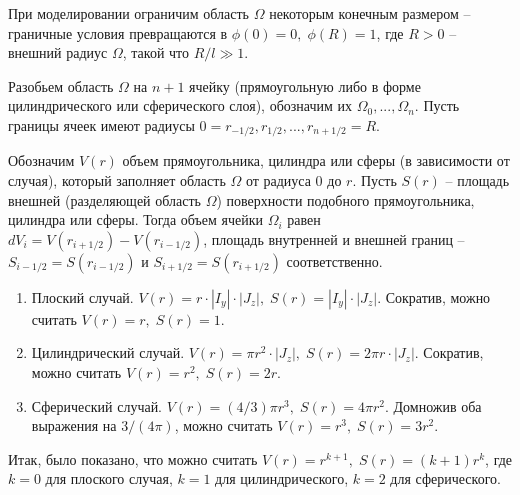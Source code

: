 При моделировании ограничим область $\Omega$ некоторым конечным размером -- граничные условия превращаются в $\phi(0) = 0, \; \phi(R) = 1$, где $R > 0$ -- внешний радиус $\Omega$, такой что $R / l \gg 1$.

Разобьем область $\Omega$ на $n + 1$ ячейку (прямоугольную либо в форме цилиндрического или сферического слоя), обозначим их $\Omega_0, ..., \Omega_n$. Пусть границы ячеек имеют радиусы $0 = r_{-1/2}, r_{1/2}, ..., r_{n + 1/2} = R$.

Обозначим $V(r)$ объем прямоугольника, цилиндра или сферы (в зависимости от случая), который заполняет область $\Omega$ от радиуса $0$ до $r$. Пусть $S(r)$ -- площадь внешней (разделяющей область $\Omega$) поверхности подобного прямоугольника, цилиндра или сферы. Тогда объем ячейки $\Omega_i$ равен $dV_i = V(r_{i + 1/2}) - V(r_{i - 1/2})$, площадь внутренней и внешней границ -- $S_{i - 1/2} = S(r_{i - 1/2})$ и $S_{i + 1/2} = S(r_{i + 1/2})$ соответственно.

\begin{enumerate}[label=\arabic*.]
	\item Плоский случай. $V(r) = r \cdot |I_y| \cdot |J_z|, \; S(r) = |I_y| \cdot |J_z|$. Сократив, можно считать $V(r) = r, \; S(r) = 1$.
	\item Цилиндрический случай. $V(r) = \pi r^2 \cdot |J_z|, \; S(r) = 2 \pi r \cdot |J_z|$. Сократив, можно считать $V(r) = r^2, \; S(r) = 2r$.
	\item Сферический случай. $V(r) = (4/3) \pi r^3, \; S(r) = 4 \pi r^2$. Домножив оба выражения на $3/(4\pi)$, можно считать $V(r) = r^3, \; S(r) = 3 r^2$.
\end{enumerate}

Итак, было показано, что можно считать $V(r) = r^{k + 1}, \; S(r) = (k + 1)r^k$, где $k = 0$ для плоского случая, $k = 1$ для цилиндрического, $k = 2$ для сферического.


